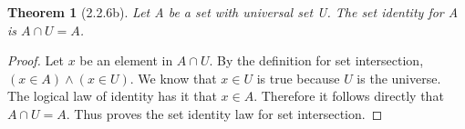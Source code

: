 \documentclass[a4paper, 12pt]{article}
\theoremstyle{plain}
\newtheorem*{theorem*}{Theorem}
\begin{document}
	
	\begin{theorem*}[2.2.6b]
		Let A be a set with universal set U. The set identity for A is $A \cap U = A$.
	\end{theorem*}
	
	\begin{proof}
		Let $x$ be an element in $A \cap U$. By the definition for set intersection, 
		$(x \in A) \land (x \in U)$. We know that $x \in U$ is true because $U$ is the 
		universe. The logical law of identity has it that $x \in A$. Therefore it follows 
		directly that $A \cap U = A$. Thus proves the set identity law for set intersection.
	\end{proof}
\end{document}
